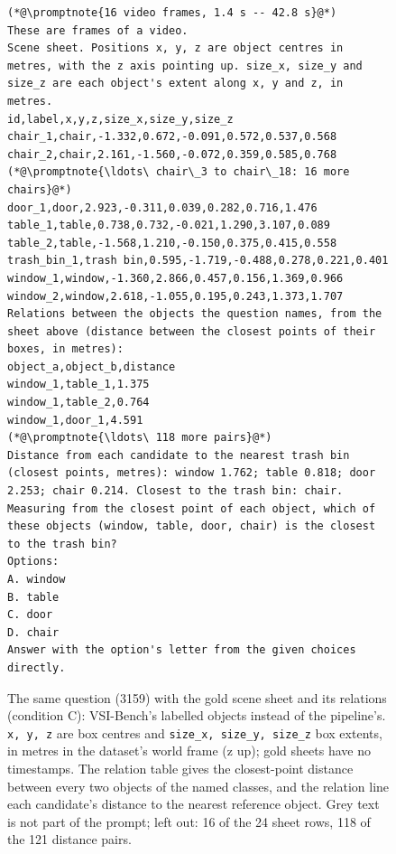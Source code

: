 \providecommand{\promptnote}[1]{{\color{gray}\itshape[#1]}}
\begin{figure}[t]
\begin{lstlisting}[style=promptbox]
(*@\promptnote{16 video frames, 1.4 s -- 42.8 s}@*)
These are frames of a video.
Scene sheet. Positions x, y, z are object centres in metres, with the z axis pointing up. size_x, size_y and size_z are each object's extent along x, y and z, in metres.
id,label,x,y,z,size_x,size_y,size_z
chair_1,chair,-1.332,0.672,-0.091,0.572,0.537,0.568
chair_2,chair,2.161,-1.560,-0.072,0.359,0.585,0.768
(*@\promptnote{\ldots\ chair\_3 to chair\_18: 16 more chairs}@*)
door_1,door,2.923,-0.311,0.039,0.282,0.716,1.476
table_1,table,0.738,0.732,-0.021,1.290,3.107,0.089
table_2,table,-1.568,1.210,-0.150,0.375,0.415,0.558
trash_bin_1,trash bin,0.595,-1.719,-0.488,0.278,0.221,0.401
window_1,window,-1.360,2.866,0.457,0.156,1.369,0.966
window_2,window,2.618,-1.055,0.195,0.243,1.373,1.707
Relations between the objects the question names, from the sheet above (distance between the closest points of their boxes, in metres):
object_a,object_b,distance
window_1,table_1,1.375
window_1,table_2,0.764
window_1,door_1,4.591
(*@\promptnote{\ldots\ 118 more pairs}@*)
Distance from each candidate to the nearest trash bin (closest points, metres): window 1.762; table 0.818; door 2.253; chair 0.214. Closest to the trash bin: chair.
Measuring from the closest point of each object, which of these objects (window, table, door, chair) is the closest to the trash bin?
Options:
A. window
B. table
C. door
D. chair
Answer with the option's letter from the given choices directly.
\end{lstlisting}
\caption{The same question (3159) with the gold scene sheet and its relations (condition C): VSI-Bench's labelled objects instead of the pipeline's. \texttt{x, y, z} are box centres and \texttt{size\_x, size\_y, size\_z} box extents, in metres in the dataset's world frame (z up); gold sheets have no timestamps. The relation table gives the closest-point distance between every two objects of the named classes, and the relation line each candidate's distance to the nearest reference object. Grey text is not part of the prompt; left out: 16 of the 24 sheet rows, 118 of the 121 distance pairs.}
\label{fig:prompt-gold}
\end{figure}
